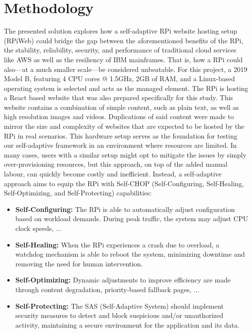 \documentclass[conference]{IEEEtran}
\begin{document}
\section{\textbf{Methodology}}\label{methodology}
The presented solution explores how a self-adaptive RPi website hosting setup (RPiWeb) could bridge the gap between the aforementioned benefits of the RPi, the stability, reliability, security, and performance of traditional cloud services like AWS as well as the resiliency of IBM mainframes. That is, how a RPi could also—at a much smaller scale—be considered unbeatable. For this project, a 2019 Model B, featuring 4 CPU cores @ 1.5GHz, 2GB of RAM, and a Linux-based operating system is selected and acts as the managed element. The RPi is hosting a React based website that was also prepared specifically for this study. This website contains a combination of simple content, such as plain text, as well as high resolution images and videos. Duplications of said content were made to mirror the size and complexity of websites that are expected to be hosted by the RPi in real scenarios. This hardware setup serves as the foundation for testing our self-adaptive framework in an environment where resources are limited. In many cases, users with a similar setup might opt to mitigate the issues by simply over-provisioning resources, but this approach, on top of the added manual labour, can quickly become costly and inefficient. Instead, a self-adaptive approach aims to equip the RPi with Self-CHOP (Self-Configuring, Self-Healing, Self-Optimizing, and Self-Protecting) capabilities:

\begin{itemize}
    \item \textbf{Self-Configuring:}
          The RPi is able to automatically adjust configuration based on workload demands. During peak traffic, the system may adjust CPU clock speeds, ...
    \item \textbf{Self-Healing:}
          When the RPi experiences a crash due to overload, a watchdog mechanism is able to reboot the system, minimizing downtime and removing the need for human intervention.
    \item \textbf{Self-Optimizing:}
          Dynamic adjustments to improve efficiency are made through content degradation, priority-based fallback pages, ...
    \item \textbf{Self-Protecting:}
          The SAS (Self-Adaptive System) should implement security measures to detect and block suspicious and/or unauthorized activity, maintaining a secure environment for the application and its data.
\end{itemize}
\end{document}
